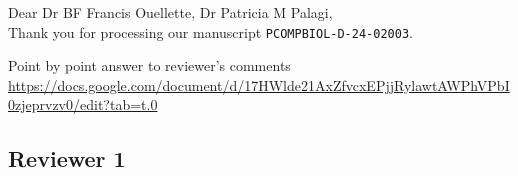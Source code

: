 \documentclass[a4paper]{article}
\newcommand{\editor}{Dr BF Francis Ouellette, Dr Patricia M Palagi}
\begin{document}
\noindent Dear \editor,\\

Thank you for processing our manuscript \texttt{PCOMPBIOL-D-24-02003}.

Point by point answer to reviewer's comments \url{https://docs.google.com/document/d/17HWlde21AxZfvcxEPjjRylawtAWPhVPbI0zjeprvzv0/edit?tab=t.0}


\subsection*{Reviewer 1}
\end{document}
